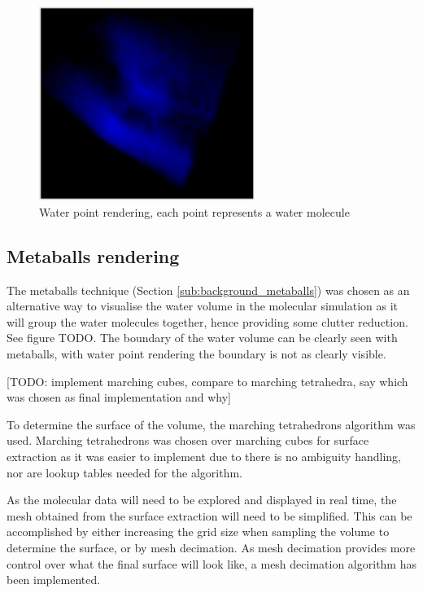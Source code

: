 \begin{figure}[h!]
  \begin{center}
    \includegraphics[width=70mm]{waterpoint}
  \end{center}
  \caption{Water point rendering, each point represents a water molecule}
  \label{fig:design_waterpoint}
\end{figure}


\subsection{Metaballs rendering}
\label{sub:design_metaballs}

The metaballs technique (Section \ref{sub:background_metaballs}) was chosen as
an alternative way to visualise the water volume in the molecular simulation as
it will group the water molecules together, hence providing some clutter
reduction. See figure TODO. The boundary of the water volume can be clearly
seen with metaballs, with water point rendering the boundary is not as clearly
visible.

[TODO: implement marching cubes, compare to marching tetrahedra, say which was
chosen as final implementation and why]

To determine the surface of the volume, the marching tetrahedrons algorithm was
used. Marching tetrahedrons was chosen over marching cubes for surface
extraction as it was easier to implement due to there is no ambiguity handling,
nor are lookup tables needed for the algorithm.

As the molecular data will need to be explored and displayed in real time, the
mesh obtained from the surface extraction will need to be simplified. This can
be accomplished by either increasing the grid size when sampling the volume to
determine the surface, or by mesh decimation. As mesh decimation provides more
control over what the final surface will look like, a mesh decimation algorithm
has been implemented.

